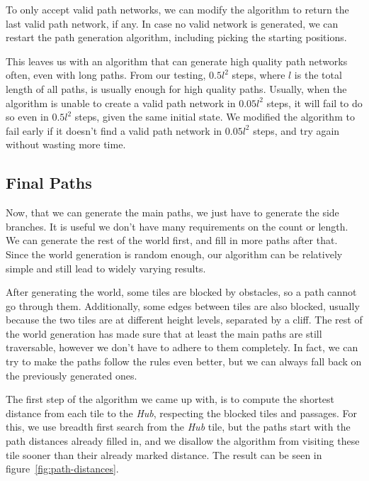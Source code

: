 To only accept valid path networks, we can modify the algorithm to return the last valid path network, if any.
In case no valid network is generated, we can restart the path generation algorithm, including picking the starting positions.

This leaves us with an algorithm that can generate high quality path networks often, even with long paths.
From our testing, $0.5l^2$ steps, where $l$ is the total length of all paths, is usually enough for high quality paths.
Usually, when the algorithm is unable to create a valid path network in $0.05l^2$ steps, it will fail to do so even in $0.5l^2$ steps, given the same initial state.
We modified the algorithm to fail early if it doesn't find a valid path network in $0.05l^2$ steps, and try again without wasting more time.

\subsection{Final Paths}

Now, that we can generate the main paths, we just have to generate the side branches.
It is useful we don't have many requirements on the count or length.
We can generate the rest of the world first, and fill in more paths after that.
Since the world generation is random enough, our algorithm can be relatively simple and still lead to widely varying results.

After generating the world, some tiles are blocked by obstacles, so a path cannot go through them.
Additionally, some edges between tiles are also blocked, usually because the two tiles are at different height levels, separated by a cliff.
The rest of the world generation has made sure that at least the main paths are still traversable, however we don't have to adhere to them completely.
In fact, we can try to make the paths follow the rules even better, but we can always fall back on the previously generated ones.

The first step of the algorithm we came up with, is to compute the shortest distance from each tile to the \emph{Hub}, respecting the blocked tiles and passages.
For this, we use breadth first search from the \emph{Hub} tile, but the paths start with the path distances already filled in, and we disallow the algorithm from visiting these tile sooner than their already marked distance.
The result can be seen in figure~\ref{fig:path-distances}.

